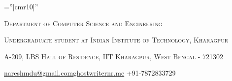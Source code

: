 \documentclass[a4paper,10pt]{extarticle} %
\begin{document}
\pagestyle{empty} %

\font\fb=''[cmr10]'' %


\par{\par} %
\par{\centering\large {\textsc{Department of Computer Science and Engineering}}\par}\large
\par{\centering\large {\textsc{Undergraduate student at Indian Institute of Technology, Kharagpur}}\par}\large
\par{\centering\large {\textsc{A-209, LBS Hall of Residence, IIT Kharagpur, West Bengal - 721302}}\par}\large
\hspace{3.5cm}\normalsize {\href{mailto:nareshmdu@gmail.com}{nareshmdu@gmail.com}}\hfill \normalsize {\href{http://ghostwriternr.me/}{ghostwriternr.me}} \hfill {+91-7872833729}\hspace{3.5cm}




\end{document}
